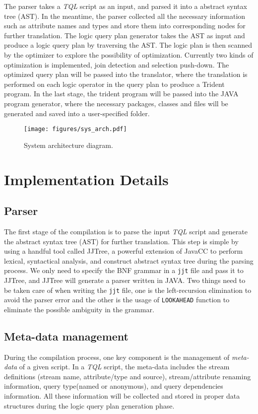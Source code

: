 \documentclass[conference, twocolumn, 11pt]{IEEEtran}
\theoremstyle{definition}
\begin{document}
The parser takes a \emph{TQL} script as an input, and parsed it into a abstract syntax tree (AST). In the meantime, the parser collected all the necessary information such as attribute names and types and store them into corresponding nodes for further translation. The logic query plan generator takes the AST as input and produce a logic query plan by traversing the AST. The logic plan is then scanned by the optimizer to explore the possibility of optimization. Currently two kinds of optimization is implemented, join detection and selection push-down. The optimized query plan will be passed into the translator, where the translation is performed on each logic operator in the query plan to produce a Trident program. In the last stage, the trident program will be passed into the JAVA program generator, where the necessary packages, classes and files will be generated and saved into a user-specified folder.

\begin{figure}[hbt]
\centering
\texttt{[image: figures/sys\_arch.pdf]}
\caption{System architecture diagram.}
\label{arch-diag}
\end{figure}

\section{Implementation Details}\label{impl}
\subsection{Parser}
The first stage of the compilation is to parse the input \emph{TQL} script and generate the abstract syntax tree (AST) for further translation. This step is simple by using a handful tool called JJTree, a powerful extension of JavaCC to perform lexical, syntactical analysis, and construct abstract syntax tree during the parsing process. We only need to specify the BNF grammar in a \texttt{jjt} file and pass it to JJTree, and JJTree will generate a parser written in JAVA. Two things need to be taken care of when writing the \texttt{jjt} file, one is the left-recursion elimination to avoid the parser error and the other is the usage of \texttt{LOOKAHEAD} function to eliminate the possible ambiguity in the grammar.

\subsection{Meta-data management}
During the compilation process, one key component is the management of \emph{meta-data} of a given script. In a \emph{TQL} script, the meta-data includes the stream definitions (stream name, attribute/type and source), stream/attribute renaming information, query type(named or anonymous), and query dependencies information. All these information will be collected and stored in proper data structures during the logic query plan generation phase. 
\end{document}
